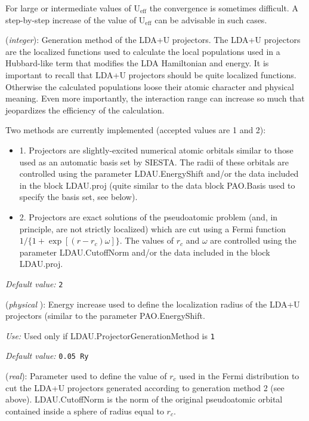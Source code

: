 For large or intermediate values of U$_{\mathrm{eff}}$ the convergence
is sometimes difficult. A step-by-step increase of the
value of U$_{\mathrm{eff}}$ can be advisable in such cases.

\begin{description}
\itemsep 10pt
\parsep 0pt

\item[\textbf{LDAU.ProjectorGenerationMethod}] (\textit{integer}):
Generation method of the LDA+U projectors. The LDA+U projectors are the
localized functions used
to calculate the local populations used in a Hubbard-like term
that modifies the LDA Hamiltonian and  energy. It is important
to recall that LDA+U projectors should be quite localized functions.
Otherwise the calculated populations loose their atomic character
and physical meaning. Even more importantly,
the interaction range can increase so much that jeopardizes
the efficiency of the calculation.

Two methods are currently implemented (accepted values are 1 and 2):
\begin{itemize}
\item 1. Projectors are slightly-excited numerical atomic orbitals
similar to those used as an automatic basis set by  SIESTA.
The radii of these orbitals are controlled using
the parameter LDAU.EnergyShift and/or the data included in the 
block LDAU.proj (quite similar to the data block PAO.Basis used
to specify the basis set, see below).
\item 2. Projectors are exact solutions of the pseudoatomic
problem (and, in principle, are not strictly localized) which are
cut using a Fermi function $1/\{1+\exp[(r-r_c)\omega]\}$.
The values of $r_c$ and $\omega$ are controlled using
the parameter LDAU.CutoffNorm and/or the  data included in the
block LDAU.proj.
\end{itemize}

\textit{Default value:}  \texttt{2}

\item[\textbf{LDAU.EnergyShift}]  (\textit{physical }):
Energy increase used to define the localization radius
of the LDA+U projectors (similar to the parameter
PAO.EnergyShift.

\textit{Use:} Used only if LDAU.ProjectorGenerationMethod is \texttt{1 }

\textit{Default value:} \texttt{0.05 Ry}

\item[\textbf{LDAU.CutoffNorm}] (\textit{real}):
Parameter used to define the value of $r_c$ used in the Fermi distribution to
cut the LDA+U projectors generated according to generation
method 2 (see above). LDAU.CutoffNorm is
the norm of the original pseudoatomic orbital
contained inside a sphere of radius equal to $r_c$.


\end{description}
